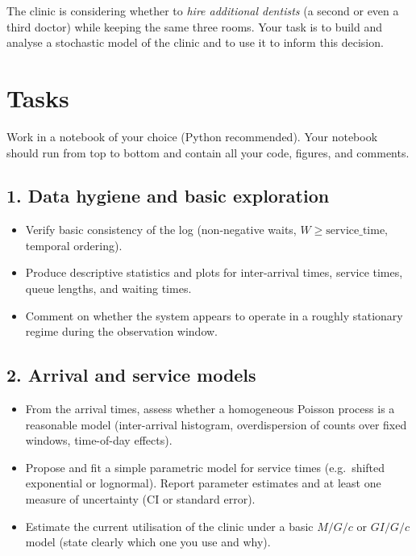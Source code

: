 \documentclass[a4paper,11pt]{article}
\begin{document}
The clinic is considering whether to \emph{hire additional dentists} (a second or even a third doctor) while keeping the same three rooms. Your task is to build and analyse a stochastic model of the clinic and to use it to inform this decision.

\section*{Tasks}

Work in a notebook of your choice (Python recommended). Your notebook should run from top to bottom and contain all your code, figures, and comments.

\subsection*{1. Data hygiene and basic exploration}
\begin{itemize}
  \item Verify basic consistency of the log (non-negative waits, $W \geq \text{service\_time}$, temporal ordering).
  \item Produce descriptive statistics and plots for inter-arrival times, service times, queue lengths, and waiting times.
  \item Comment on whether the system appears to operate in a roughly stationary regime during the observation window.
\end{itemize}

\subsection*{2. Arrival and service models}
\begin{itemize}
  \item From the arrival times, assess whether a homogeneous Poisson process is a reasonable model (inter-arrival histogram, overdispersion of counts over fixed windows, time-of-day effects).
  \item Propose and fit a simple parametric model for service times (e.g.\ shifted exponential or lognormal). Report parameter estimates and at least one measure of uncertainty (CI or standard error).
  \item Estimate the current utilisation of the clinic under a basic $M/G/c$ or $GI/G/c$ model (state clearly which one you use and why).
\end{itemize}
\end{document}
